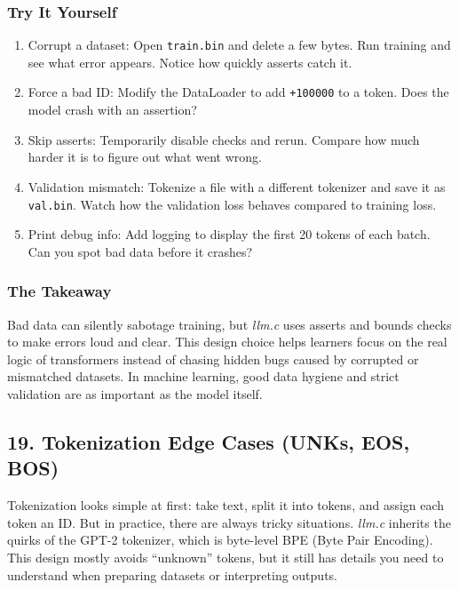 \documentclass[
  letterpaper,
  DIV=11,
  numbers=noendperiod]{scrreprt}
\providecommand{\tightlist}{%
  \setlength{\itemsep}{0pt}\setlength{\parskip}{0pt}}
\begin{document}
\subsubsection{Try It Yourself}\label{try-it-yourself-7}

\begin{enumerate}
\def\labelenumi{\arabic{enumi}.}
\tightlist
\item
  Corrupt a dataset: Open \texttt{train.bin} and delete a few bytes. Run
  training and see what error appears. Notice how quickly asserts catch
  it.
\item
  Force a bad ID: Modify the DataLoader to add \texttt{+100000} to a
  token. Does the model crash with an assertion?
\item
  Skip asserts: Temporarily disable checks and rerun. Compare how much
  harder it is to figure out what went wrong.
\item
  Validation mismatch: Tokenize a file with a different tokenizer and
  save it as \texttt{val.bin}. Watch how the validation loss behaves
  compared to training loss.
\item
  Print debug info: Add logging to display the first 20 tokens of each
  batch. Can you spot bad data before it crashes?
\end{enumerate}

\subsubsection{The Takeaway}\label{the-takeaway-7}

Bad data can silently sabotage training, but \emph{llm.c} uses asserts
and bounds checks to make errors loud and clear. This design choice
helps learners focus on the real logic of transformers instead of
chasing hidden bugs caused by corrupted or mismatched datasets. In
machine learning, good data hygiene and strict validation are as
important as the model itself.

\subsection{19. Tokenization Edge Cases (UNKs, EOS,
BOS)}\label{tokenization-edge-cases-unks-eos-bos}

Tokenization looks simple at first: take text, split it into tokens, and
assign each token an ID. But in practice, there are always tricky
situations. \emph{llm.c} inherits the quirks of the GPT-2 tokenizer,
which is byte-level BPE (Byte Pair Encoding). This design mostly avoids
``unknown'' tokens, but it still has details you need to understand when
preparing datasets or interpreting outputs.
\end{document}

